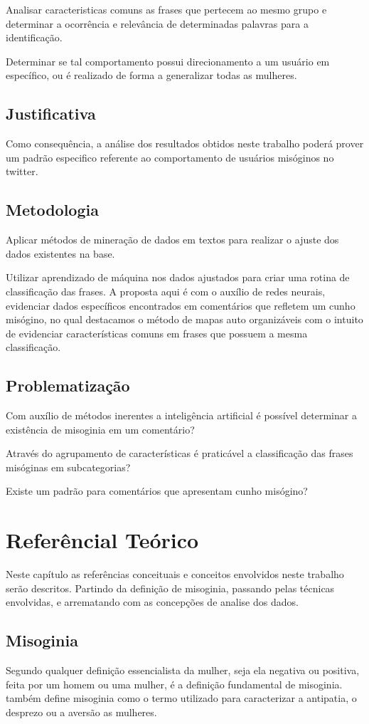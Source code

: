 \documentclass[
	12pt,				%
	openright,			%
	twoside,			%
	a4paper,			%
	english,			%
	french,				%
	spanish,			%
	brazil				%
	]{abntex2}
\begin{document}
Analisar caracteristicas comuns as frases que pertecem ao mesmo grupo e determinar a ocorrência e relevância de determinadas palavras para a identificação.

Determinar se tal comportamento possui direcionamento a um usuário em específico, ou é realizado de forma a generalizar todas as mulheres.

\section{Justificativa}
Como consequência, a análise dos resultados obtidos neste trabalho poderá prover um padrão especifico referente ao comportamento de usuários misóginos no twitter.

\section{Metodologia}
Aplicar métodos de mineração de dados em textos para realizar o ajuste dos dados existentes na base. 

Utilizar aprendizado de máquina nos dados ajustados para criar uma rotina de classificação das frases.
A proposta aqui é com o auxílio de redes neurais, evidenciar dados específicos encontrados em comentários que refletem um cunho misógino, no qual destacamos o método de mapas auto organizáveis com o intuito de evidenciar características comuns em frases que possuem a mesma classificação.


\section{Problematização}
Com auxílio de métodos inerentes a inteligência artificial é possível determinar a existência de misoginia em um comentário?

Através do agrupamento de características é praticável a classificação das frases misóginas em subcategorias?

Existe um padrão para comentários que apresentam cunho misógino? 
\chapter{Referêncial Teórico}
Neste capítulo as referências conceituais e  conceitos envolvidos neste trabalho serão descritos. Partindo da definição de misoginia, passando pelas técnicas envolvidas, e arrematando com as concepções de analise dos dados.

\section{Misoginia}
Segundo  qualquer definição essencialista da mulher, seja ela negativa ou positiva, feita por um homem ou uma mulher, é a definição fundamental de misoginia.  também define misoginia como o termo utilizado para caracterizar a antipatia, o desprezo ou a aversão as mulheres.
\end{document}
